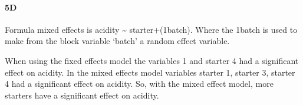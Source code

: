 \documentclass[
]{article}
\begin{document}
\hypertarget{d-4}{%
\paragraph{\texorpdfstring{\textbf{5D}}{5D}}\label{d-4}}

Formula mixed effects is acidity \textasciitilde{}
starter+(1\textbar batch). Where the 1\textbar batch is used to make
from the block variable `batch' a random effect variable.

When using the fixed effects model the variables 1 and starter 4 had a
significant effect on acidity. In the mixed effects model variables
starter 1, starter 3, starter 4 had a significant effect on acidity. So,
with the mixed effect model, more starters have a significant effect on
acidity.
\end{document}
